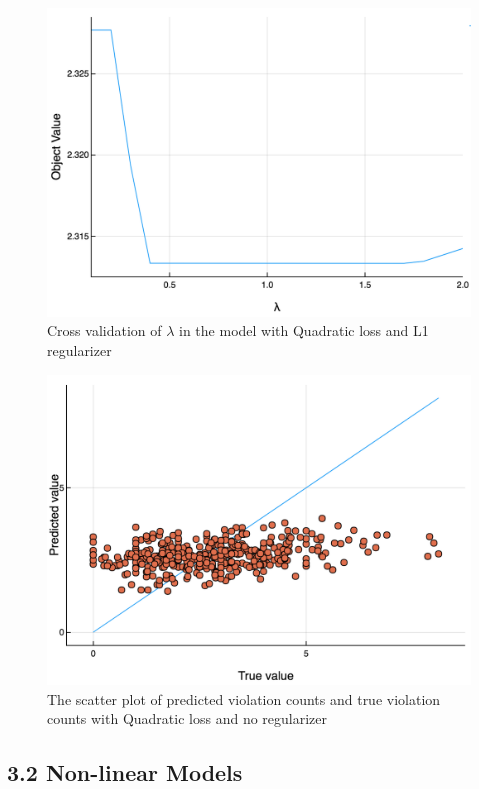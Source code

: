 \documentclass[letterpaper, 11 pt, conference]{ieeeconf}
\begin{document}
\begin{figure}[h]
	\centering
    \includegraphics[scale = 0.35]{cv_l1}
    \caption{Cross validation of $\lambda$ in the model with Quadratic loss and L1 regularizer}
\end{figure}

\begin{figure}[h]
	\centering
    \includegraphics[scale = 0.35]{quad_noreg}
    \caption{The scatter plot of predicted violation counts and true violation counts with Quadratic loss and no regularizer}
\end{figure}




\subsection*{3.2 Non-linear Models}
\end{document}
